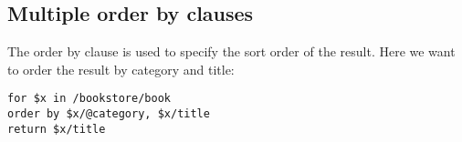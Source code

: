 \documentclass[slides]{pgnotes}
\begin{document}
\subsection{Multiple order by clauses}

The order by clause is used to specify the sort order of the result. Here we want to order the result by category and title:

\begin{verbatim}
for $x in /bookstore/book
order by $x/@category, $x/title
return $x/title
\end{verbatim}



\end{document}
